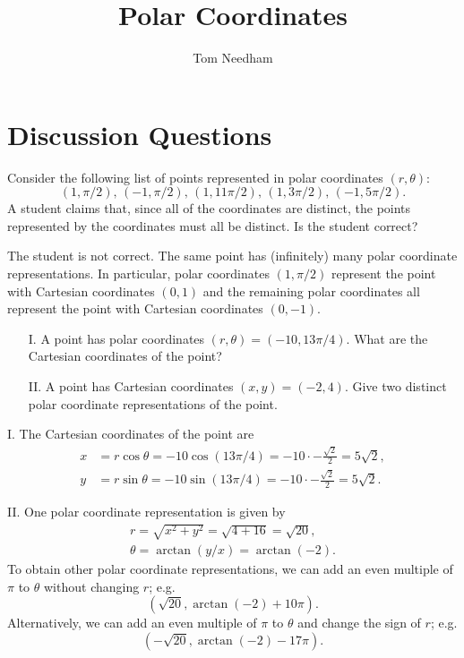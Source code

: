 \documentclass[noauthor]{ximera}
\author{Tom Needham}
\title[Collaborate:]{Polar Coordinates}
\begin{document}
\begin{abstract}
\end{abstract}
\maketitle

\section{Discussion Questions}

\begin{problem}
Consider the following list of points represented in polar coordinates $(r,\theta)$:
$$
(1,\pi/2), \, (-1,\pi/2),\,  (1,11\pi/2), \, (1,3\pi/2), \, (-1,5\pi/2).
$$
A student claims that, since all of the coordinates are distinct, the points represented by the coordinates must all be distinct. Is the student correct?
\begin{freeResponse}
The student is not correct. The same point has (infinitely) many polar coordinate representations. In particular, polar coordinates $(1,\pi/2)$ represent the point with Cartesian coordinates $(0,1)$ and the remaining polar coordinates all represent the point with Cartesian coordinates $(0,-1)$.
\end{freeResponse}
\end{problem}

\begin{problem}
\begin{itemize}
\item[I.] A point has polar coordinates $(r,\theta)=(-10,13\pi/4)$. What are the Cartesian coordinates of the point?

\item[II.] A point has Cartesian coordinates $(x,y)=(-2,4)$. Give two distinct polar coordinate representations of the point.
\end{itemize}

\begin{freeResponse}
I. The Cartesian coordinates of the point are 
\begin{align*}
x&= r \cos \theta = -10 \cos (13\pi/4) = -10 \cdot -\frac{\sqrt{2}}{2} = 5 \sqrt{2}, \\
y &= r \sin \theta = -10 \sin (13 \pi/ 4) = -10 \cdot -\frac{\sqrt{2}}{2} = 5 \sqrt{2}.
\end{align*}

II. One polar coordinate representation is given by
\begin{align*}
r = \sqrt{x^2 + y^2} = \sqrt{4 + 16} = \sqrt{20}, \\
\theta = \arctan (y/x) = \arctan (-2).
\end{align*}
To obtain other polar coordinate representations, we can add an even multiple of $\pi$ to $\theta$ without changing $r$; e.g.
$$
\left(\sqrt{20},\arctan(-2) + 10 \pi \right).
$$
Alternatively, we can add an even multiple of $\pi$ to $\theta$ and change the sign of $r$; e.g.
$$
\left(-\sqrt{20},\arctan(-2)-17 \pi\right).
$$
\end{freeResponse}
\end{problem}
\end{document}
